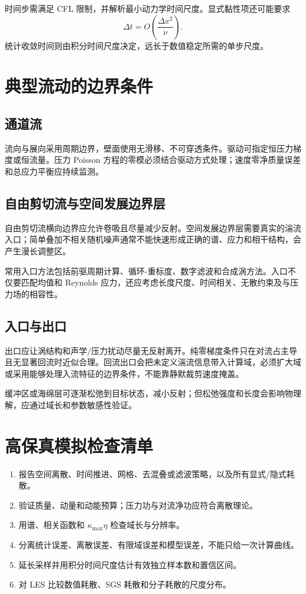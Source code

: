 \documentclass[12pt,a4paper,openany,fontset=none]{ctexbook}
\begin{document}
时间步需满足 CFL 限制，并解析最小动力学时间尺度。显式黏性项还可能要求
\begin{equation}
 \Delta t=O\!\left(\frac{\Delta x^2}{\nu}\right).
\end{equation}
统计收敛时间则由积分时间尺度决定，远长于数值稳定所需的单步尺度。

\section{典型流动的边界条件}

\subsection{通道流}

流向与展向采用周期边界，壁面使用无滑移、不可穿透条件。驱动可指定恒压力梯度或恒流量。压力 Poisson 方程的零模必须结合驱动方式处理；速度零净质量误差和总应力平衡应持续监测。

\subsection{自由剪切流与空间发展边界层}

自由剪切流横向边界应允许卷吸且尽量减少反射。空间发展边界层需要真实的湍流入口；简单叠加不相关随机噪声通常不能快速形成正确的谱、应力和相干结构，会产生漫长调整区。

常用入口方法包括前驱周期计算、循环-重标度、数字滤波和合成涡方法。入口不仅要匹配均值和 Reynolds 应力，还应考虑长度尺度、时间相关、无散约束及与压力场的相容性。

\subsection{入口与出口}

出口应让涡结构和声学/压力扰动尽量无反射离开。纯零梯度条件只在对流占主导且无显著回流时近似合理。回流出口会把未定义湍流信息带入计算域，必须扩大域或采用能够处理入流特征的边界条件，不能靠静默裁剪速度掩盖。

缓冲区或海绵层可逐渐松弛到目标状态，减小反射；但松弛强度和长度会影响物理解，应通过域长和参数敏感性验证。

\section*{高保真模拟检查清单}
\begin{enumerate}
 \item 报告空间离散、时间推进、网格、去混叠或滤波策略，以及所有显式/隐式耗散。
 \item 验证质量、动量和动能预算；压力功与对流净功应符合离散理论。
 \item 用谱、相关函数和 $\kappa_{\max}\eta$ 检查域长与分辨率。
 \item 分离统计误差、离散误差、有限域误差和模型误差，不能只给一次计算曲线。
 \item 延长采样并用积分时间尺度估计有效独立样本数和置信区间。
 \item 对 LES 比较数值耗散、SGS 耗散和分子耗散的尺度分布。
\end{enumerate}
\end{document}
